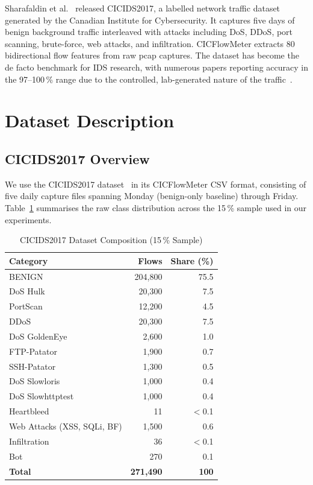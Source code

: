 \documentclass[conference]{IEEEtran}
\begin{document}
Sharafaldin et al.~\cite{sharafaldin2018} released CICIDS2017, a
labelled network traffic dataset generated by the Canadian Institute
for Cybersecurity.  It captures five days of benign background traffic
interleaved with attacks including DoS, DDoS, port scanning, brute-force,
web attacks, and infiltration.  CICFlowMeter extracts 80 bidirectional
flow features from raw pcap captures.  The dataset has become the
de facto benchmark for IDS research, with numerous papers reporting
accuracy in the 97--100\,\% range due to the controlled, lab-generated
nature of the traffic~\cite{ferrag2020}.

\section{Dataset Description}
\label{sec:dataset}

\subsection{CICIDS2017 Overview}

We use the CICIDS2017 dataset~\cite{sharafaldin2018} in its
CICFlowMeter CSV format, consisting of five daily capture files
spanning Monday (benign-only baseline) through Friday.
Table~\ref{tab:dataset} summarises the raw class distribution across
the 15\,\% sample used in our experiments.

\begin{table}[ht]
\caption{CICIDS2017 Dataset Composition (15\,\% Sample)}
\label{tab:dataset}
\centering
\begin{tabular}{lrr}
\toprule
\textbf{Category} & \textbf{Flows} & \textbf{Share (\%)} \\
\midrule
BENIGN                     & 204{,}800 & 75.5 \\
DoS Hulk                   &  20{,}300 &  7.5 \\
PortScan                   &  12{,}200 &  4.5 \\
DDoS                       &  20{,}300 &  7.5 \\
DoS GoldenEye              &   2{,}600 &  1.0 \\
FTP-Patator                &   1{,}900 &  0.7 \\
SSH-Patator                &   1{,}300 &  0.5 \\
DoS Slowloris              &   1{,}000 &  0.4 \\
DoS Slowhttptest           &   1{,}000 &  0.4 \\
Heartbleed                 &      11   & $<$0.1 \\
Web Attacks (XSS, SQLi, BF)&   1{,}500 &  0.6 \\
Infiltration               &      36   & $<$0.1 \\
Bot                        &     270   &  0.1 \\
\midrule
\textbf{Total}             & \textbf{271{,}490} & \textbf{100} \\
\bottomrule
\end{tabular}
\end{table}
\end{document}
